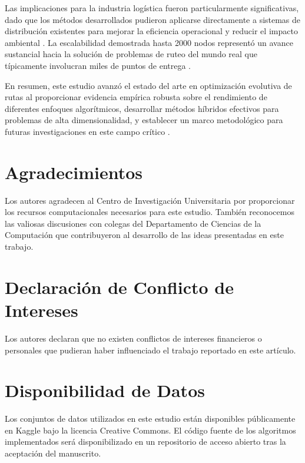 \documentclass[12pt,a4paper]{article}
\begin{document}
Las implicaciones para la industria logística fueron particularmente significativas, dado que los métodos desarrollados pudieron aplicarse directamente a sistemas de distribución existentes para mejorar la eficiencia operacional y reducir el impacto ambiental \cite{bektas2014green}. La escalabilidad demostrada hasta 2000 nodos representó un avance sustancial hacia la solución de problemas de ruteo del mundo real que típicamente involucran miles de puntos de entrega \cite{vidal2013hybrid}.

En resumen, este estudio avanzó el estado del arte en optimización evolutiva de rutas al proporcionar evidencia empírica robusta sobre el rendimiento de diferentes enfoques algorítmicos, desarrollar métodos híbridos efectivos para problemas de alta dimensionalidad, y establecer un marco metodológico para futuras investigaciones en este campo crítico \cite{laporte2009vehicle}.

\section{Agradecimientos}

Los autores agradecen al Centro de Investigación Universitaria por proporcionar los recursos computacionales necesarios para este estudio. También reconocemos las valiosas discusiones con colegas del Departamento de Ciencias de la Computación que contribuyeron al desarrollo de las ideas presentadas en este trabajo.

\section{Declaración de Conflicto de Intereses}

Los autores declaran que no existen conflictos de intereses financieros o personales que pudieran haber influenciado el trabajo reportado en este artículo.

\section{Disponibilidad de Datos}

Los conjuntos de datos utilizados en este estudio están disponibles públicamente en Kaggle bajo la licencia Creative Commons. El código fuente de los algoritmos implementados será disponibilizado en un repositorio de acceso abierto tras la aceptación del manuscrito.
\end{document}
